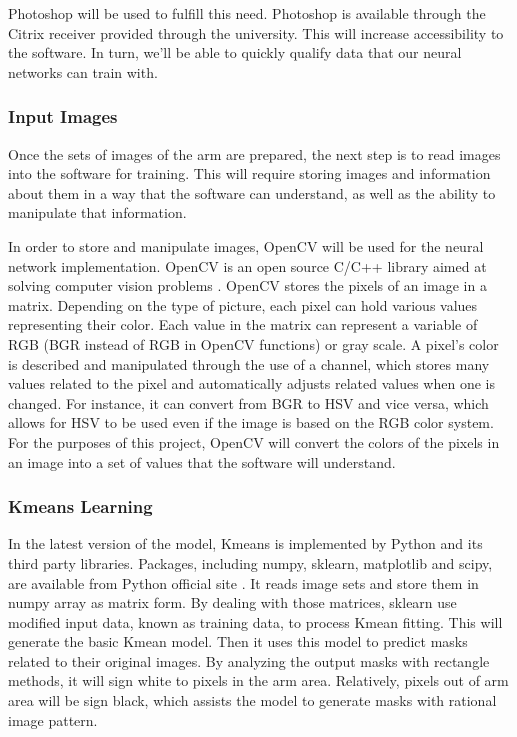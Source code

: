 \documentclass[10pt,journal,compsoc, draftclsnofoot,onecolumn]{IEEEtran}
\begin{document}
\noindent
Photoshop will be used to fulfill this need.
Photoshop is available through the Citrix receiver provided through the university.
This will increase accessibility to the software. In turn, we'll be able to quickly qualify data that our neural networks can train with.

\subsubsection{Input Images}
Once the sets of images of the arm are prepared, the next step is to read images into the software for training.
This will require storing images and information about them in a way that the software can understand, as well as the ability to manipulate that information.

\noindent
In order to store and manipulate images, OpenCV will be used for the neural network implementation.
OpenCV is an open source C/C++ library aimed at solving computer vision problems \cite{1:online}.
OpenCV stores the pixels of an image in a matrix.
Depending on the type of picture, each pixel can hold various values representing their color.
Each value in the matrix can represent a variable of RGB (BGR instead of RGB in OpenCV functions) or gray scale.
A pixel's color is described and manipulated through the use of a channel, which stores many values related to the pixel and automatically adjusts related values when one is changed.
For instance, it can convert from BGR to HSV and vice versa, which allows for HSV to be used even if the image is based on the RGB color system.
For the purposes of this project, OpenCV will convert the colors of the pixels in an image into a set of values that the software will understand.

\subsubsection{Kmeans Learning}
In the latest version of the model, Kmeans is implemented by Python and its third party libraries. Packages, including numpy, sklearn, matplotlib and scipy, are available from Python official site \cite{4:online}. It reads image sets and store them in numpy array as matrix form. By dealing with those matrices, sklearn use modified input data, known as training data, to process Kmean fitting. This will generate the basic Kmean model. Then it uses this model to predict masks related to their original images. By analyzing the output masks with rectangle methods, it will sign white to pixels in the arm area. Relatively, pixels out of arm area will be sign black, which assists the model to generate masks with rational image pattern. 
\end{document}
